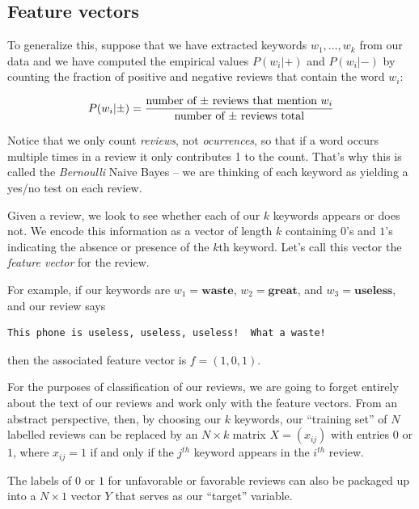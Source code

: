 \documentclass[
]{article}
\begin{document}
\hypertarget{feature-vectors}{%
\subsection{Feature vectors}\label{feature-vectors}}

To generalize this, suppose that we have extracted keywords
\(w_1,\ldots, w_k\) from our data and we have computed the empirical
values \(P(w_{i}|+)\) and \(P(w_{i}|-)\) by counting the fraction of
positive and negative reviews that contain the word \(w_{i}\):

\[
P(w_{i}|\pm) = \frac{\hbox{\rm number of $\pm$ reviews that mention $w_{i}$}}{\hbox{\rm number of $\pm$ reviews total}}
\]

Notice that we only count \emph{reviews}, not \emph{ocurrences}, so that
if a word occurs multiple times in a review it only contributes 1 to the
count. That's why this is called the \emph{Bernoulli} Naive Bayes -- we
are thinking of each keyword as yielding a yes/no test on each review.

Given a review, we look to see whether each of our \(k\) keywords
appears or does not. We encode this information as a vector of length
\(k\) containing \(0\)'s and \(1\)'s indicating the absence or presence
of the \(k\)th keyword. Let's call this vector the \emph{feature vector}
for the review.

For example, if our keywords are \(w_1=\mathbf{waste}\),
\(w_2=\mathbf{great}\), and \(w_3=\mathbf{useless}\), and our review
says

\begin{lstlisting}
This phone is useless, useless, useless!  What a waste!
\end{lstlisting}

then the associated feature vector is \(f=(1,0,1)\).

For the purposes of classification of our reviews, we are going to
forget entirely about the text of our reviews and work only with the
feature vectors. From an abstract perspective, then, by choosing our
\(k\) keywords, our ``training set'' of \(N\) labelled reviews can be
replaced by an \(N\times k\) matrix \(X=(x_{ij})\) with entries \(0\) or
\(1\), where \(x_{ij}=1\) if and only if the \(j^{th}\) keyword appears
in the \(i^{th}\) review.

The labels of \(0\) or \(1\) for unfavorable or favorable reviews can
also be packaged up into a \(N\times 1\) vector \(Y\) that serves as our
``target'' variable.
\end{document}
